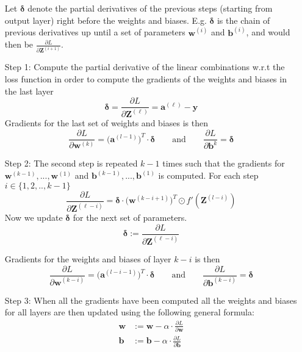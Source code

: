 \begin{algorithmic}
    \STATE \begin{enumerate}[itemsep=0.3cm]
        \item[] 
        Let $\boldsymbol{\delta}$ denote the partial derivatives of the previous steps (starting from output layer) right before the weights and biases. E.g. $\boldsymbol{\delta}$ is the chain of previous derivatives up until a set of parameters $\boldsymbol{w}^{(i)}$ and $\boldsymbol{b}^{(i)}$, and would then be $\frac{\partial L}{\partial \boldsymbol{Z}^{(i+1)}}$. 
        
        \item[Step 1:] Compute the partial derivative of the linear combinations w.r.t the loss function in order to compute the gradients of the weights and biases in the last layer\\ 
        \[
        \boldsymbol{\delta} = \frac{\partial L}{\partial \boldsymbol{Z}^{(\ell)}} = \boldsymbol{a}^{(\ell)} - \boldsymbol{y}
        \]
        Gradients for the last set of weights and biases is then
        \[
            \frac{\partial L}{\partial \boldsymbol{w}^{(k)}} = \big(\boldsymbol{a}^{(l-1)}\big)^T\cdot\boldsymbol{\delta} \qquad \text{and} \qquad \frac{\partial L}{\partial \boldsymbol{b}^k} = \boldsymbol{\delta}
        \]
        \item[Step 2:]The second step is repeated $k-1$ times such that the gradients for $\boldsymbol{w}^{(k-1)},..., \boldsymbol{w}^{(1)}$ and $\boldsymbol{b}^{(k-1)},..., \boldsymbol{b}^{(1)}$ is computed. 
        For each step $i\in\{1,2,..,k-1\}$  
        \[
            \frac{\partial L}{\partial \boldsymbol{Z}^{(\ell - i)}} = \boldsymbol{\delta}\cdot \big(\boldsymbol{w}^{(k-i+1)}\big)^T \odot f'(\boldsymbol{Z}^{(l-i)})
        \]
        Now we update $\boldsymbol{\delta}$ for the next set of parameters. 
        \[
            \boldsymbol{\delta} :=  \frac{\partial L}{\partial \boldsymbol{Z}^{(\ell - i)}} 
        \]
        \item[] Gradients for the weights and biases of layer $k-i$ is then
        \[
            \frac{\partial L}{\partial \boldsymbol{w}^{(k-i)}} = \big(\boldsymbol{a}^{(l-i-1)}\big)^T \cdot \boldsymbol{\delta} \qquad \text{and} \qquad \frac{\partial L}{\partial \boldsymbol{b}^{(k-i)}} = \boldsymbol{\delta}
        \]
        \item[Step 3:] When all the gradients have been computed all the weights and biases for all layers are then updated using the following general formula:
        \[
            \begin{aligned}
            \boldsymbol{w} &:= \boldsymbol{w} - \alpha \cdot \frac{\partial L}{\partial\boldsymbol{w}} \\
            \boldsymbol{b} &:= \boldsymbol{b} - \alpha \cdot \frac{\partial L}{\partial\boldsymbol{b}}
            \end{aligned}
        \]
        \end{enumerate}
\end{algorithmic}
